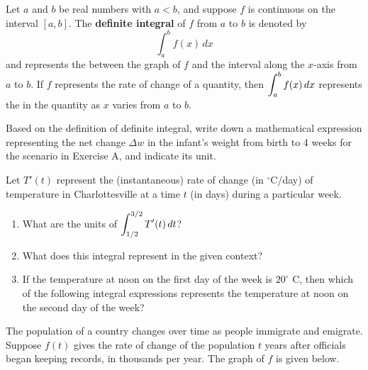 \documentclass[10pt]{article}
\begin{document}
\newpage

{
Let $a$ and $b$ be real numbers with $a<b$, and suppose $f$ is continuous on the interval $[a,b]$. The {\bf definite integral} of $f$ from $a$ to $b$ is denoted by \[\int_a^b f(x)\,dx\] and represents the  between the graph of $f$ and the interval along the $x$-axis from $a$ to $b$. If $f$ represents the rate of change of a quantity, then $\displaystyle \int_a^b f(x)\,dx$ represents the  in the quantity as $x$ varies from $a$ to $b$.
}

\example{} Based on the definition of definite integral, write down a mathematical expression representing the net change $\Delta w$ in the infant's weight from birth to 4 weeks for the scenario in Exercise A, and indicate its unit.

\vfill

\exercise{} Let $T'(t)$ represent the (instantaneous) rate of change (in $^{\circ}$C/day) of temperature in Charlottesville at a time $t$ (in days) during a particular week. 

\begin{enumerate}
\item[(a)] What are the units of $\displaystyle \int_{1/2}^{3/2} T'(t)\,dt$? 

\item[(b)] What does this integral represent in the given context?
    \vfill



\item[(c)] If the temperature at noon on the first day of the week is $20^{\circ}$ C, then which of the following integral expressions represents the temperature at noon on the second day of the week?
\end{enumerate}

\newpage
\exercise{} The population of a country changes over time as people immigrate and emigrate. Suppose $f(t)$ gives the rate of change of the population $t$ years after officials began keeping records, in thousands per year. The graph of $f$ is given below.\\
\end{document}
